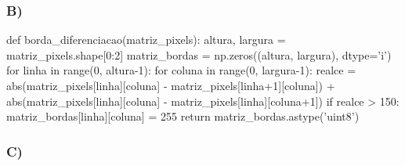 \documentclass[a4paper,12pt]{article}
\begin{document}
\subsubsection{B)}
\begin{python}
def borda_diferenciacao(matriz_pixels):
   altura, largura = matriz_pixels.shape[0:2]
   matriz_bordas = np.zeros((altura, largura), dtype='i')
   for linha in range(0, altura-1):
     for coluna in range(0, largura-1):
       realce = abs(matriz_pixels[linha][coluna]
        - matriz_pixels[linha+1][coluna]) + abs(matriz_pixels[linha][coluna]
        - matriz_pixels[linha][coluna+1])
       if realce > 150:
         matriz_bordas[linha][coluna] = 255
   return matriz_bordas.astype('uint8')
\end{python}
\subsubsection{C)}
\end{document}
